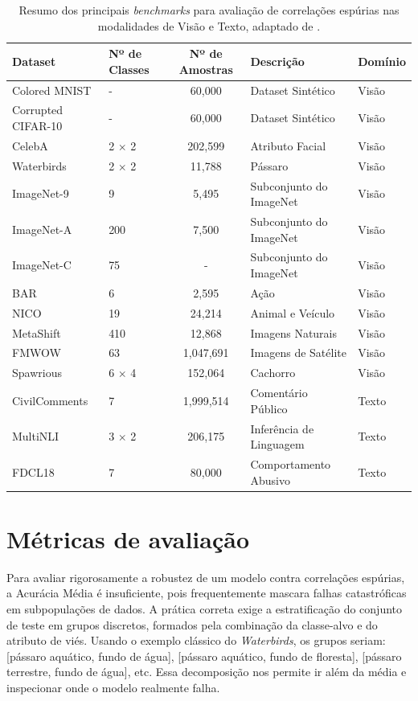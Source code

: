 \begin{table}[htbp]
\centering
\footnotesize %
\caption{Resumo dos principais \textit{benchmarks} para avaliação de correlações espúrias nas modalidades de Visão e Texto, adaptado de \cite{spurious_correlations_survey}.}
\label{tab:spurious_benchmarks_pt}
\begin{tabular}{llcll}
\toprule
\textbf{Dataset} & \textbf{Nº de Classes} & \textbf{Nº de Amostras} & \textbf{Descrição} & \textbf{Domínio} \\
\midrule
Colored MNIST & - & 60,000 & Dataset Sintético & Visão \\
Corrupted CIFAR-10 & - & 60,000 & Dataset Sintético & Visão \\
CelebA & 2 $\times$ 2 & 202,599 & Atributo Facial & Visão \\
Waterbirds & 2 $\times$ 2 & 11,788 & Pássaro & Visão \\
ImageNet-9 & 9 & 5,495 & Subconjunto do ImageNet & Visão \\
ImageNet-A & 200 & 7,500 & Subconjunto do ImageNet & Visão \\
ImageNet-C & 75 & - & Subconjunto do ImageNet & Visão \\
BAR & 6 & 2,595 & Ação & Visão \\
NICO & 19 & 24,214 & Animal e Veículo & Visão \\
MetaShift & 410 & 12,868 & Imagens Naturais & Visão \\
FMWOW & 63 & 1,047,691 & Imagens de Satélite & Visão \\
Spawrious & 6 $\times$ 4 & 152,064 & Cachorro & Visão \\
CivilComments & 7 & 1,999,514 & Comentário Público & Texto \\
MultiNLI & 3 $\times$ 2 & 206,175 & Inferência de Linguagem & Texto \\
FDCL18 & 7 & 80,000 & Comportamento Abusivo & Texto \\
\bottomrule
\end{tabular}
\end{table}

\section{Métricas de avaliação}

Para avaliar rigorosamente a robustez de um modelo contra correlações espúrias, a Acurácia Média é insuficiente, pois frequentemente mascara falhas catastróficas em subpopulações de dados. A prática correta exige a estratificação do conjunto de teste em grupos discretos, formados pela combinação da classe-alvo e do atributo de viés. Usando o exemplo clássico do \textit{Waterbirds}, os grupos seriam: [pássaro aquático, fundo de água], [pássaro aquático, fundo de floresta], [pássaro terrestre, fundo de água], etc. Essa decomposição nos permite ir além da média e inspecionar onde o modelo realmente falha.

